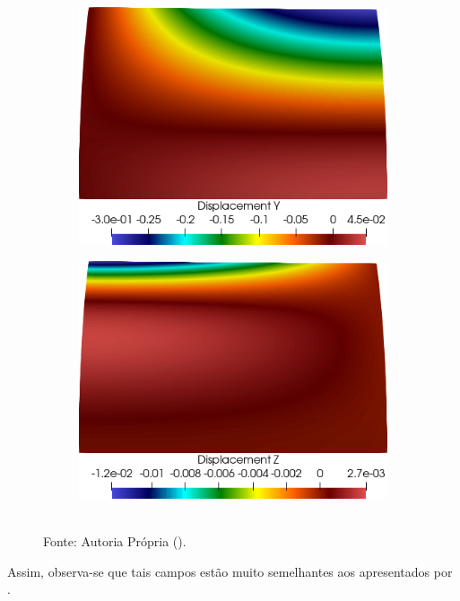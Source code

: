 \begin{figure}[h!]
\begin{subfigure}{0.31\textwidth}
    \end{subfigure}
    \begin{subfigure}{0.31\textwidth}
        \includegraphics[width=\linewidth]{Figuras/scordelis/uy.png}
    \end{subfigure}
    \begin{subfigure}{0.31\textwidth}
        \includegraphics[width=\linewidth]{Figuras/scordelis/uz.png}
    \end{subfigure}
    \\Fonte: Autoria Própria (\the\year).
    \label{fig:scordelis-displ}
\end{figure}

Assim, observa-se que tais campos estão muito semelhantes aos apresentados por . 

